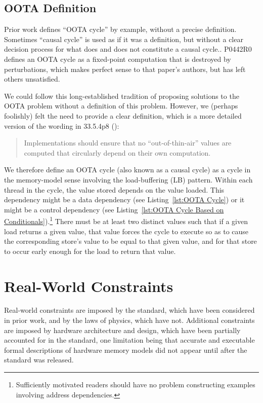 \documentclass[10]{article}
\begin{document}
\subsection{OOTA Definition}
\label{sec:OOTA Definition}

Prior work defines ``OOTA cycle'' by example, without a precise
definition.
Sometimes ``causal cycle'' is used as if it was a definition, but
without a clear decision process for what does and does not
constitute a causal cycle..
P0442R0 defines an OOTA cycle as a fixed-point computation that is
destroyed by perturbations, which makes perfect sense to that paper's
authors, but has left others unsatisfied.

We could follow this long-established tradition of proposing
solutions to the OOTA problem without a definition of this problem.
However, we (perhaps foolishly) felt the need to provide a clear
definition, which is a more detailed version of the wording in 33.5.4p8
():

\begin{quote}
	Implementations should ensure that no “out-of-thin-air” values
	are computed that circularly depend on their own computation.
\end{quote}

We therefore define an OOTA cycle (also known as a causal cycle) as a
cycle in the memory-model sense involving the load-buffering (LB) pattern.
Within each thread in the cycle, the value stored depends on
the value loaded.
This dependency might be a data dependency
(see Listing~\ref{lst:OOTA Cycle})
or it might be a control dependency
(see Listing~\ref{lst:OOTA Cycle Based on Conditionals}).\footnote{
	Sufficiently motivated readers should have no problem constructing
	examples involving address dependencies.}
There must be at least two distinct values such that if a given load
returns a given value, that value forces the cycle to execute so as to
cause the corresponding store's value to be equal to that given value, and
for that store to occur early enough for the load to return that value.

\section{Real-World Constraints}
\label{sec:Real-World Constraints}

Real-world constraints are imposed by the standard, which have been
considered in prior work, and by the laws of physics, which have
not.
Additional constraints are imposed by hardware architecture and
design, which have been partially accounted for in the standard,
one limitation being that accurate and executable formal descriptions
of hardware memory models did not appear until after the standard
was released.
\end{document}
